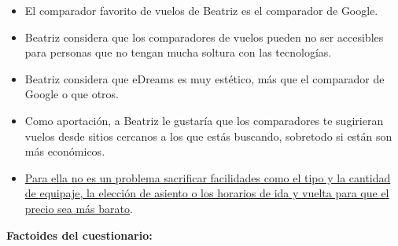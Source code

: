 \begin{itemize}
    \item El comparador favorito de vuelos de Beatriz es el comparador de Google.
    \item Beatriz considera que los comparadores de vuelos pueden no ser accesibles para personas que no tengan mucha soltura con las tecnologías.
    \item Beatriz considera que eDreams es muy estético, más que el comparador de Google o que otros.
    \item Como aportación, a Beatriz le gustaría que los comparadores te sugirieran vuelos desde sitios cercanos a los que estás buscando, sobretodo si están son más económicos.
    \item \underline{Para ella no es un problema sacrificar facilidades como el tipo y la cantidad de equipaje, la elección de asiento o los horarios de ida y vuelta para que el precio sea más barato}.
\end{itemize}


\textbf{Factoides del cuestionario:}

